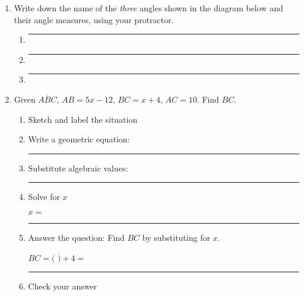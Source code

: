 \documentclass[12pt, twoside]{article}
\begin{document}
\begin{enumerate}
\item Write down the name of the \emph{three} angles shown in the diagram below and their angle measures, using your protractor. \vspace{1cm}
    \begin{center}
    \end{center}
    \begin{enumerate}
      \item  \rule{4cm}{0.15mm} \bigskip
      \item  \rule{4cm}{0.15mm} \bigskip
      \item  \rule{4cm}{0.15mm} \bigskip
    \end{enumerate}

\newpage
\item Given $\overline{ABC}$, $AB=5x-12$, $BC=x+4$, $AC=10$. Find ${BC}$.
    \begin{enumerate}
      \item Sketch and label the situation
      \begin{flushright}
      \end{flushright} \vspace{1cm}
      \item Write a geometric equation: \rule{5cm}{0.15mm} \vspace{1cm}
      \item Substitute algebraic values: \rule{5cm}{0.15mm}
      \item Solve for $x$
      \vspace{3cm}
      \begin{center} $x=$ \rule{1cm}{0.15mm} \end{center}
      \item Answer the question: Find $BC$ by substituting for $x$.\\
      \begin{center} $BC=($ \hspace{1cm} $)+4=$ \rule{1cm}{0.15mm} \end{center}
      \item Check your answer
    \end{enumerate}
    \vspace{2cm}


\end{enumerate}
\end{document}
